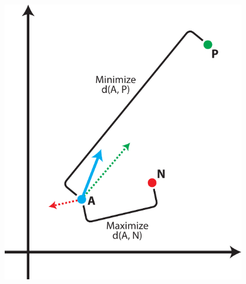 \documentclass[aspectratio=169,10pt]{beamer}
\begin{document}
\begin{frame}
\begin{columns}[T]
        \begin{column}{0.4\textwidth}
            \centering
            \includegraphics[width=0.8\textwidth]{tripletloss_viz_vertical.pdf} %
        \end{column}
    \end{columns}
\end{frame}
\end{document}

